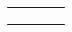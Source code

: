 \begin{table}[!ht]
\begin{tabularx}{\textwidth}{|p{3.23cm}|K{5cm}|K{3cm}|K{4cm}|}
		&                                                                    &                                                         &                                                                                                                                                                   \\ \hline
		&                                                                    &                                                         &                                                                                                                                                                   \\ \hline
		&                                                                    &                                                         &                                                                                                                                                                   \\ \hline
		&                                                                    &                                                         &                                                                                                                                                                   \\ \hline
	\end{tabularx}
\end{table}




